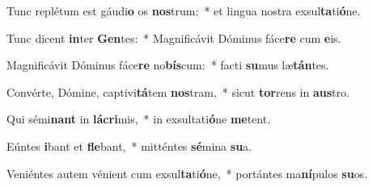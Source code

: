 \item Tunc replétum est gáudi\textbf{o} os \textbf{nos}trum:~* et lingua nostra exsul\textbf{ta}ti\textbf{ó}ne.
\item Tunc dicent \textbf{in}ter \textbf{Gen}tes:~* Magnificávit Dóminus fáce\textbf{re} cum \textbf{e}is.
\item Magnificávit Dóminus fáce\textbf{re} no\textbf{bís}cum:~* facti \textbf{su}mus læ\textbf{tán}tes.
\item Convérte, Dómine, captivi\textbf{tá}tem \textbf{nos}tram,~* sicut \textbf{tor}rens in \textbf{aus}tro.
\item Qui sémi\textbf{nant} in \textbf{lá}\textbf{cri}mis,~* in exsultati\textbf{ó}ne \textbf{me}tent.
\item Eúntes \textbf{i}bant et \textbf{fle}bant,~* mitténtes \textbf{sé}mina \textbf{su}a.
\item Veniéntes autem vénient cum exsul\textbf{ta}ti\textbf{ó}ne,~* portántes ma\textbf{ní}pulos \textbf{su}os.
